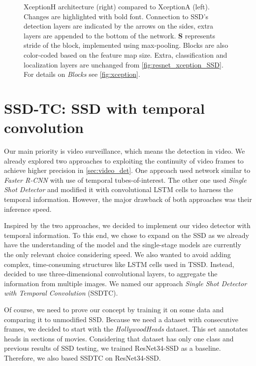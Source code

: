 \begin{figure}
    \centering
    \xceptionSSD
    \caption[XceptionH-SSD]%
    {XceptionH architecture (right) compared to XceptionA (left). Changes are highlighted with bold font. Connection to SSD's detection layers are indicated by the arrows on the sides, extra layers are appended to the bottom of the network.  \textbf{S} represents stride of the block, implemented using max-pooling. Blocks are also color-coded based on the feature map size. Extra, classification and localization layers are unchanged from \cref{fig:resnet_xception_SSD}. For details on \textit{Blocks} see \cref{fig:xception}.} 
    \label{fig:xceptionH_SSD}
\end{figure}




\section{SSD-TC: SSD with temporal convolution}
Our main priority is video surveillance, which means the detection in video. We already explored two approaches to exploiting the continuity of video frames to achieve higher precision in \cref{sec:video_det}. One approach used network similar to \textit{Faster R-CNN} with use of temporal tubes-of-interest. The other one used \textit{Single Shot Detector} and modified it with convolutional LSTM cells to harness the temporal information. However, the major drawback of both approaches was their inference speed. 

Inspired by the two approaches, we decided to implement our video detector with temporal information. To this end, we chose to expand on the SSD as we already have the understanding of the model and the single-stage models are currently the only relevant choice considering speed. We also wanted to avoid adding complex, time-consuming structures like LSTM cells used in TSSD. Instead, decided to use three-dimensional convolutional layers, to aggregate the information from multiple images. We named our approach \textit{Single Shot Detector with Temporal Convolution} (SSDTC).

Of course, we need to prove our concept by training it on some data and comparing it to unmodified SSD. Because we need a dataset with consecutive frames, we decided to start with the \textit{HollywoodHeads} dataset. This set annotates heads in sections of movies. Considering that dataset has only one class and previous results of SSD testing, we trained ResNet34-SSD as a baseline. Therefore, we also based SSDTC on ResNet34-SSD.

